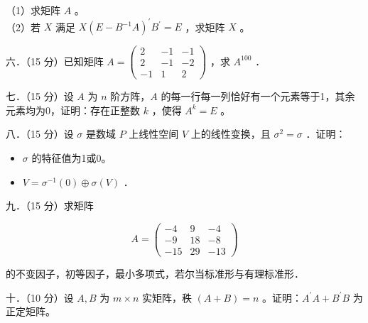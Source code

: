 \documentclass{article}
\begin{document}
（1）求矩阵 \(A\) 。\\
（2）若 \(X\) 满足 \(X\left(E-B^{-1} A\right)^{\prime} B^{\prime}=E\) ，求矩阵 \(X\) 。

六．（15 分）已知矩阵 \(A=\left(\begin{array}{ccc}2 & -1 & -1 \\ 2 & -1 & -2 \\ -1 & 1 & 2\end{array}\right)\) ，求 \(A^{100}\) ．

七．（15 分）设 \(A\) 为 \(n\) 阶方阵，\(A\) 的每一行每一列恰好有一个元素等于1，其余元素均为0，证明：存在正整数 \(k\) ，使得 \(A^{k}=E\) 。

八．（15 分）设 \(\sigma\) 是数域 \(P\) 上线性空间 \(V\) 上的线性变换，且 \(\sigma^{2}=\sigma\) ．证明：

\begin{itemize}
  \item[（1）] \(\sigma\) 的特征值为1或0。
  \item[（2）] \(V=\sigma^{-1}(0) \oplus \sigma(V)\) ．
\end{itemize}

九．（15 分）求矩阵

\[
A=\left(\begin{array}{ccc}
-4 & 9 & -4 \\
-9 & 18 & -8 \\
-15 & 29 & -13
\end{array}\right)
\]

的不变因子，初等因子，最小多项式，若尔当标准形与有理标准形．

十．（10 分）设 \(A, B\) 为 \(m \times n\) 实矩阵，秩 \((A+B)=n\) 。证明：\(A^{\prime} A+B^{\prime} B\) 为正定矩阵。
\end{document}
